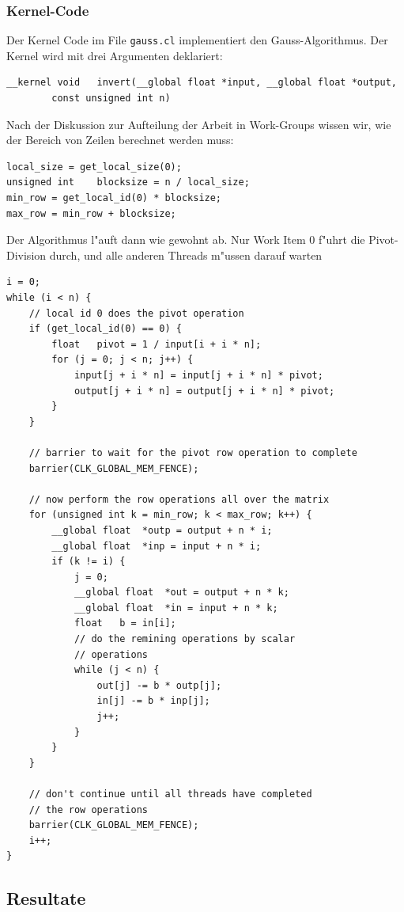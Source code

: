 \subsubsection{Kernel-Code}
Der Kernel Code im File \verb+gauss.cl+ implementiert den Gauss-Algorithmus.
Der Kernel wird mit drei Argumenten deklariert:
\begin{verbatim}
__kernel void   invert(__global float *input, __global float *output,
        const unsigned int n)
\end{verbatim}
Nach der Diskussion zur Aufteilung der Arbeit in Work-Groups wissen wir,
wie der Bereich von Zeilen berechnet werden muss:
\begin{verbatim}
local_size = get_local_size(0);
unsigned int    blocksize = n / local_size;
min_row = get_local_id(0) * blocksize;
max_row = min_row + blocksize;
\end{verbatim}
Der Algorithmus l"auft dann wie gewohnt ab.
Nur Work Item 0 f"uhrt die Pivot-Division durch, und alle anderen
Threads m"ussen darauf warten
\begin{verbatim}
i = 0;
while (i < n) {
    // local id 0 does the pivot operation
    if (get_local_id(0) == 0) {
        float   pivot = 1 / input[i + i * n];
        for (j = 0; j < n; j++) {
            input[j + i * n] = input[j + i * n] * pivot;
            output[j + i * n] = output[j + i * n] * pivot;
        }
    }

    // barrier to wait for the pivot row operation to complete
    barrier(CLK_GLOBAL_MEM_FENCE);

    // now perform the row operations all over the matrix
    for (unsigned int k = min_row; k < max_row; k++) {
        __global float  *outp = output + n * i;
        __global float  *inp = input + n * i;
        if (k != i) {
            j = 0; 
            __global float  *out = output + n * k;
            __global float  *in = input + n * k;
            float   b = in[i];
            // do the remining operations by scalar
            // operations
            while (j < n) {
                out[j] -= b * outp[j];
                in[j] -= b * inp[j];
                j++;
            }
        }
    }

    // don't continue until all threads have completed
    // the row operations
    barrier(CLK_GLOBAL_MEM_FENCE);
    i++;
}
\end{verbatim}

\subsection{Resultate}


